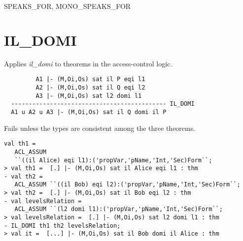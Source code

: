 \SEEALSO
SPEAKS\_FOR, MONO\_SPEAKS\_FOR

\ENDDOC

\section{IL\_DOMI}




\egroup

\SYNOPSIS
Applies \emph{il\_domi} to theorems in the access-control logic.

\DESCRIBE

\begin{verbatim}
         A1 |- (M,Oi,Os) sat il P eqi l1
         A2 |- (M,Oi,Os) sat il Q eqi l2  
         A3 |- (M,Oi,Os) sat l2 domi l1
  -------------------------------------------- IL_DOMI
  A1 u A2 u A3 |- (M,Oi,Os) sat il Q domi il P
\end{verbatim}

\FAILURE
Fails unless the types are consistent among the three
theorems.

\EXAMPLE
\begin{holboxed}
\begin{verbatim}
val th1 = 
   ACL_ASSUM 
   ``((il Alice) eqi l1):('propVar,'pName,'Int,'Sec)Form``;
> val th1 =  [.] |- (M,Oi,Os) sat il Alice eqi l1 : thm
- val th2 = 
   ACL_ASSUM ``((il Bob) eqi l2):('propVar,'pName,'Int,'Sec)Form``;
> val th2 =  [.] |- (M,Oi,Os) sat il Bob eqi l2 : thm
- val levelsRelation = 
   ACL_ASSUM ``(l2 domi l1):('propVar,'pName,'Int,'Sec)Form``;
> val levelsRelation =  [.] |- (M,Oi,Os) sat l2 domi l1 : thm
- IL_DOMI th1 th2 levelsRelation;
> val it =  [...] |- (M,Oi,Os) sat il Bob domi il Alice : thm
\end{verbatim}
\end{holboxed}

